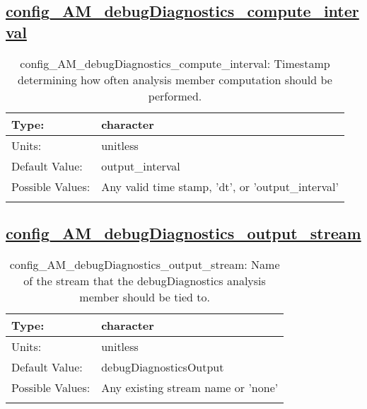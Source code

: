 \subsection[config\_AM\_debugDiagnostics\_compute\_interval]{\hyperref[sec:nm_tab_AM_debugDiagnostics]{config\_AM\_debugDiagnostics\_compute\_interval}}
\label{subsec:nm_sec_config_AM_debugDiagnostics_compute_interval}
\begin{center}
\begin{longtable}{| p{2.0in} || p{4.0in} |}
    \hline
    Type: & character \\
    \hline
    Units: & \si{unitless} \\
    \hline
    Default Value: & output\_interval \\
    \hline
    Possible Values: & Any valid time stamp, 'dt', or 'output\_interval' \\
    \hline
    \caption{config\_AM\_debugDiagnostics\_compute\_interval: Timestamp determining how often analysis member computation should be performed.}
\end{longtable}
\end{center}
\subsection[config\_AM\_debugDiagnostics\_output\_stream]{\hyperref[sec:nm_tab_AM_debugDiagnostics]{config\_AM\_debugDiagnostics\_output\_stream}}
\label{subsec:nm_sec_config_AM_debugDiagnostics_output_stream}
\begin{center}
\begin{longtable}{| p{2.0in} || p{4.0in} |}
    \hline
    Type: & character \\
    \hline
    Units: & \si{unitless} \\
    \hline
    Default Value: & debugDiagnosticsOutput \\
    \hline
    Possible Values: & Any existing stream name or 'none' \\
    \hline
    \caption{config\_AM\_debugDiagnostics\_output\_stream: Name of the stream that the debugDiagnostics analysis member should be tied to.}
\end{longtable}
\end{center}
